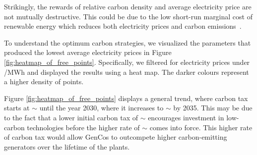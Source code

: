 Strikingly, the rewards of relative carbon density and average electricity price are not mutually destructive. This could be due to the low short-run marginal cost of renewable energy which reduces both electricity prices and carbon emissions~\cite{OMahoney2011}.





To understand the optimum carbon strategies, we visualized the parameters that produced the lowest average electricity prices in Figure \ref{fig:heatmap_of_free_points}. Specifically, we filtered for electricity prices under /MWh and displayed the results using a heat map. The darker colours represent a higher density of points. 

Figure \ref{fig:heatmap_of_free_points} displays a general trend, where carbon tax starts at ${\sim}$ until the year 2030, where it increases to ${\sim}$ by 2035. This may be due to the fact that a lower initial carbon tax of ${\sim}$ encourages investment in low-carbon technologies before the higher rate of ${\sim}$ comes into force. This higher rate of carbon tax would allow GenCos to outcompete higher carbon-emitting generators over the lifetime of the plants.






